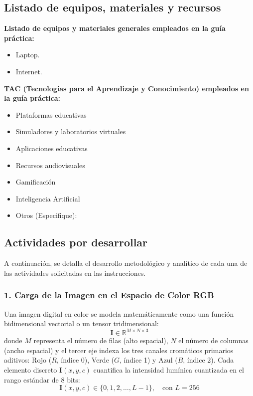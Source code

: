 \documentclass{article}
\newcommand{\checkedbox}{\stackinset{c}{0pt}{c}{0pt}{\checkmark}{$\square$}}
\begin{document}
\subsection{Listado de equipos, materiales y recursos}
\textbf{Listado de equipos y materiales generales empleados en la guía práctica:}
\begin{itemize}
    \item Laptop.
    \item Internet.
\end{itemize}

\textbf{TAC (Tecnologías para el Aprendizaje y Conocimiento) empleados en la guía práctica:}
\begin{itemize}
    \item[$\checkedbox$] Plataformas educativas
    \item[$\checkedbox$] Simuladores y laboratorios virtuales
    \item[$\checkedbox$] Aplicaciones educativas
    \item[$\square$] Recursos audiovisuales
    \item[$\square$] Gamificación
    \item[$\checkedbox$] Inteligencia Artificial
    \item Otros (Especifique): \underline{\hspace{5cm}}
\end{itemize}

\subsection{Actividades por desarrollar}

A continuación, se detalla el desarrollo metodológico y analítico de cada una de las actividades solicitadas en las instrucciones.

\subsubsection{1. Carga de la Imagen en el Espacio de Color RGB}
Una imagen digital en color se modela matemáticamente como una función bidimensional vectorial o un tensor tridimensional:
\begin{equation}
    \mathbf{I} \in \mathbb{R}^{M \times N \times 3}
\end{equation}
donde $M$ representa el número de filas (alto espacial), $N$ el número de columnas (ancho espacial) y el tercer eje indexa los tres canales cromáticos primarios aditivos: Rojo ($R$, índice 0), Verde ($G$, índice 1) y Azul ($B$, índice 2). Cada elemento discreto $\mathbf{I}(x, y, c)$ cuantifica la intensidad lumínica cuantizada en el rango estándar de 8 bits:
\begin{equation}
    \mathbf{I}(x, y, c) \in \{0, 1, 2, \dots, L - 1\}, \quad \text{con } L = 256
\end{equation}
\end{document}
